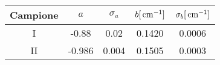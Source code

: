 \begin{tabulary}{\textwidth}{CCCCC}
\toprule
Campione & $a$  & $\sigma_a$ & $b [\,\mathrm{cm}^{-1}]$ & $\sigma_b [\,\mathrm{cm}^{-1}]$\\ \midrule
I & -0.88 & 0.02 & 0.1420 & 0.0006\\ %
II & -0.986 & 0.004 & 0.1505 & 0.0003\\
\bottomrule
\end{tabulary}

